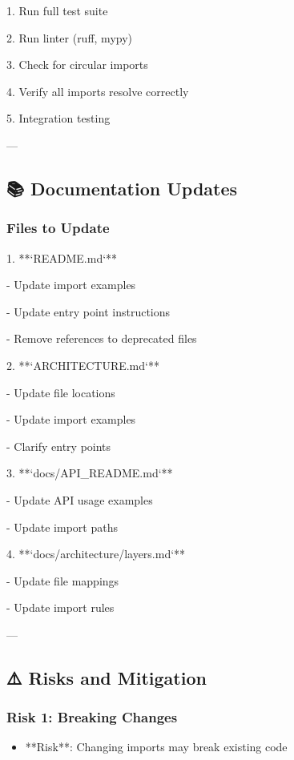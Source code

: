 \documentclass[11pt,a4paper]{article}
\begin{document}
1. Run full test suite

2. Run linter (ruff, mypy)

3. Check for circular imports

4. Verify all imports resolve correctly

5. Integration testing

---

\subsection{📚 Documentation Updates}

\subsubsection{Files to Update}

1. **`README.md`**

   - Update import examples

   - Update entry point instructions

   - Remove references to deprecated files

2. **`ARCHITECTURE.md`**

   - Update file locations

   - Update import examples

   - Clarify entry points

3. **`docs/API\_README.md`**

   - Update API usage examples

   - Update import paths

4. **`docs/architecture/layers.md`**

   - Update file mappings

   - Update import rules

---

\subsection{⚠️ Risks and Mitigation}

\subsubsection{Risk 1: Breaking Changes}

\begin{itemize}
\item **Risk**: Changing imports may break existing code
\end{itemize}
\end{document}
